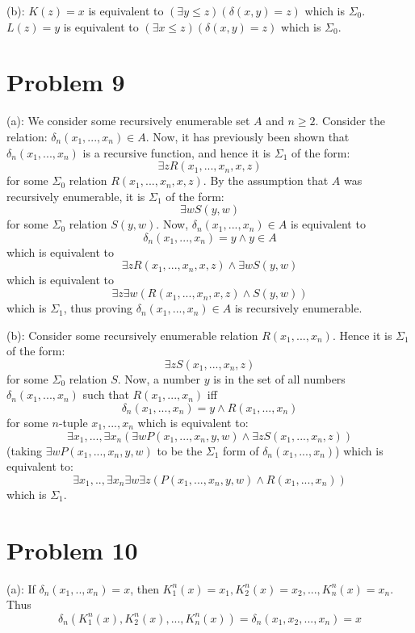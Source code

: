 \documentclass{article}
\theoremstyle{definition}
\begin{document}
(b): $K\left(z\right)=x$ is equivalent to $\left(\exists y\le z\right)\left(\delta\left(x,y\right)=z\right)$ which is $\Sigma_0$. 
$L\left(z\right)=y$ is equivalent to $\left(\exists x\le z\right)\left(\delta\left(x,y\right)=z\right)$ which is $\Sigma_0$. 

\section*{Problem 9}
(a): We consider some recursively enumerable set $A$ and $n\ge 2$. Consider the relation:
$\delta_n\left(x_1,...,x_n\right)\in A$. Now, it has previously been shown that 
$\delta_n\left(x_1,...,x_n\right)$ is a recursive function, and hence it is $\Sigma_1$ of the form:
\[ \exists zR\left(x_1,...,x_n,x,z\right) \] for some $\Sigma_0$ relation $R\left(x_1,...,x_n,x,z\right)$. By the assumption that 
$A$ was recursively enumerable, it is $\Sigma_1$ of the form:
\[ \exists wS\left(y,w\right) \] for some $\Sigma_0$ relation $S\left(y,w\right)$. Now, 
$\delta_n\left(x_1,...,x_n\right)\in A$ is equivalent to \[ \delta_n\left(x_1,...,x_n\right)=y\wedge y\in A \]
which is equivalent to \[ \exists zR\left(x_1,...,x_n,x,z\right)\wedge\exists wS\left(y,w\right) \] which is equivalent to
\[ \exists z\exists w\left(R\left(x_1,...,x_n,x,z\right)\wedge S\left(y,w\right)\right) \] which is $\Sigma_1$, thus proving 
$\delta_n\left(x_1,...,x_n\right)\in A$ is recursively enumerable.


(b): Consider some recursively enumerable relation $R\left(x_1,...,x_n\right)$. Hence it is $\Sigma_1$ of the form:
\[ \exists zS\left(x_1,...,x_n,z\right) \] for some $\Sigma_0$ relation $S$. Now, a number $y$ is in the set of all numbers 
$\delta_n\left(x_1,...,x_n\right)$ such that $R\left(x_1,...,x_n\right)$ iff 
\[ \delta_n\left(x_1,...,x_n\right)=y\wedge R\left(x_1,...,x_n\right) \] for some $n$-tuple $x_1,...,x_n$ which is equivalent to:
\[ \exists x_1,...,\exists x_n\left(\exists wP\left(x_1,...,x_n,y,w\right)\wedge \exists zS\left(x_1,...,x_n,z\right)\right) \] (taking 
$\exists wP\left(x_1,...,x_n,y,w\right)$ to be the $\Sigma_1$ form of $\delta_n\left(x_1,...,x_n\right)$) which is 
equivalent to:
\[ \exists x_1,..,\exists x_n\exists w\exists z\left(P\left(x_1,...,x_n,y,w\right)\wedge R\left(x_1,...,x_n\right)\right) \]
which is $\Sigma_1$. 

\section*{Problem 10}
(a): If $\delta_n\left(x_1,..,x_n\right)=x$, then $K_1^n\left(x\right)=x_1,K_2^n\left(x\right)=x_2,...,K_n^n\left(x\right)=x_n$. Thus
\[ \delta_n\left(K_1^n\left(x\right),K_2^n\left(x\right),...,K_n^n\left(x\right)\right)=\delta_n\left(x_1,x_2,...,x_n\right)=x \]
\end{document}
